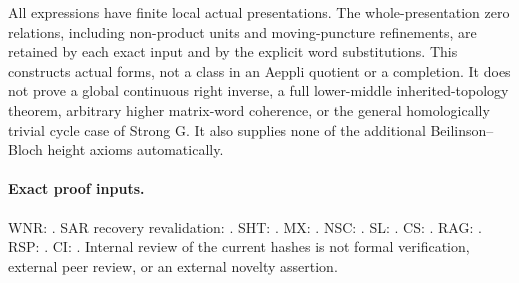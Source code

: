 All expressions have finite local actual presentations.  The
whole-presentation zero relations, including non-product units
and moving-puncture refinements, are retained by each exact
input and by the explicit word substitutions.  This constructs
actual forms, not a class in an Aeppli quotient or a completion.
It does not prove a global continuous right inverse, a full
lower-middle inherited-topology theorem, arbitrary higher
matrix-word coherence, or the general homologically trivial
cycle case of Strong G.  It also supplies none of the additional
Beilinson--Bloch height axioms automatically.

\paragraph{Exact proof inputs.}
WNR: .
SAR recovery revalidation:
.
SHT: .
MX: .
NSC: .
SL: .
CS: .
RAG: .
RSP: .
CI: .
Internal review of the current hashes is not formal verification,
external peer review, or an external novelty assertion.
